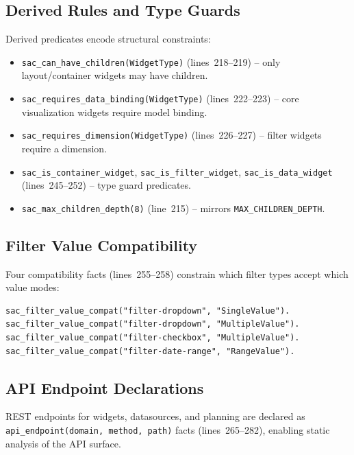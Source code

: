 \documentclass[11pt]{article}
\begin{document}
\subsection{Derived Rules and Type Guards}

Derived predicates encode structural constraints:

\begin{itemize}
  \item \texttt{sac\_can\_have\_children(WidgetType)} (lines~218--219) --
    only layout/container widgets may have children.
  \item \texttt{sac\_requires\_data\_binding(WidgetType)} (lines~222--223) --
    core visualization widgets require model binding.
  \item \texttt{sac\_requires\_dimension(WidgetType)} (lines~226--227) --
    filter widgets require a dimension.
  \item \texttt{sac\_is\_container\_widget}, \texttt{sac\_is\_filter\_widget},
    \texttt{sac\_is\_data\_widget} (lines~245--252) -- type guard predicates.
  \item \texttt{sac\_max\_children\_depth(8)} (line~215) -- mirrors
    \texttt{MAX\_CHILDREN\_DEPTH}.
\end{itemize}

\subsection{Filter Value Compatibility}

Four compatibility facts (lines~255--258) constrain which filter types accept
which value modes:

\begin{lstlisting}[caption={Filter compatibility rules (sac\_widget.mg:255--258)}]
sac_filter_value_compat("filter-dropdown", "SingleValue").
sac_filter_value_compat("filter-dropdown", "MultipleValue").
sac_filter_value_compat("filter-checkbox", "MultipleValue").
sac_filter_value_compat("filter-date-range", "RangeValue").
\end{lstlisting}

\subsection{API Endpoint Declarations}

REST endpoints for widgets, datasources, and planning are declared as
\texttt{api\_endpoint(domain, method, path)} facts (lines~265--282),
enabling static analysis of the API surface.
\end{document}
